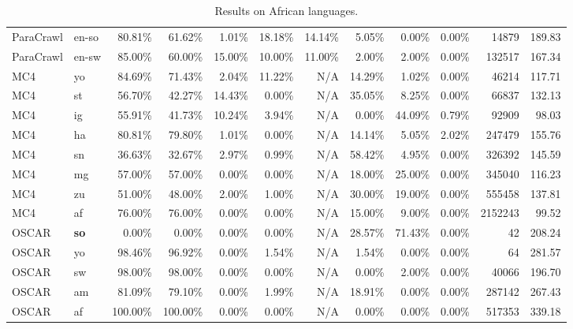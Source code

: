 \begin{table*}[hbt!]
{\begin{tabular}{l|l|rrrr|rrrr|rr}
            ParaCrawl  & en-so                   & 80.81\%  & 61.62\%  & 1.01\%  & 18.18\% & 14.14\% & 5.05\%  & 0.00\%  & 0.00\%  & 14879       & 189.83            \\
            ParaCrawl  & en-sw                   & 85.00\%  & 60.00\%  & 15.00\% & 10.00\% & 11.00\% & 2.00\%  & 2.00\%  & 0.00\%  & 132517      & 167.34            \\
            MC4        & yo                      & 84.69\%  & 71.43\%  & 2.04\%  & 11.22\% & N/A     & 14.29\% & 1.02\%  & 0.00\%  & 46214       & 117.71            \\
            MC4        & st                      & 56.70\%  & 42.27\%  & 14.43\% & 0.00\%  & N/A     & 35.05\% & 8.25\%  & 0.00\%  & 66837       & 132.13            \\
            MC4        & ig                      & 55.91\%  & 41.73\%  & 10.24\% & 3.94\%  & N/A     & 0.00\%  & 44.09\% & 0.79\%  & 92909       & 98.03             \\
            MC4        & ha                      & 80.81\%  & 79.80\%  & 1.01\%  & 0.00\%  & N/A     & 14.14\% & 5.05\%  & 2.02\%  & 247479      & 155.76            \\
            MC4        & sn                      & 36.63\%  & 32.67\%  & 2.97\%  & 0.99\%  & N/A     & 58.42\% & 4.95\%  & 0.00\%  & 326392      & 145.59            \\
            MC4        & mg                      & 57.00\%  & 57.00\%  & 0.00\%  & 0.00\%  & N/A     & 18.00\% & 25.00\% & 0.00\%  & 345040      & 116.23            \\
            MC4        & zu                      & 51.00\%  & 48.00\%  & 2.00\%  & 1.00\%  & N/A     & 30.00\% & 19.00\% & 0.00\%  & 555458      & 137.81            \\
            MC4        & af                      & 76.00\%  & 76.00\%  & 0.00\%  & 0.00\%  & N/A     & 15.00\% & 9.00\%  & 0.00\%  & 2152243     & 99.52             \\
            OSCAR      & \textbf{so}             & 0.00\%   & 0.00\%   & 0.00\%  & 0.00\%  & N/A     & 28.57\% & 71.43\% & 0.00\%  & 42          & 208.24            \\
            OSCAR      & yo                      & 98.46\%  & 96.92\%  & 0.00\%  & 1.54\%  & N/A     & 1.54\%  & 0.00\%  & 0.00\%  & 64          & 281.57            \\
            OSCAR      & sw                      & 98.00\%  & 98.00\%  & 0.00\%  & 0.00\%  & N/A     & 0.00\%  & 2.00\%  & 0.00\%  & 40066       & 196.70            \\
            OSCAR      & am                      & 81.09\%  & 79.10\%  & 0.00\%  & 1.99\%  & N/A     & 18.91\% & 0.00\%  & 0.00\%  & 287142      & 267.43            \\
            OSCAR      & af                      & 100.00\% & 100.00\% & 0.00\%  & 0.00\%  & N/A     & 0.00\%  & 0.00\%  & 0.00\%  & 517353      & 339.18            \\
            \bottomrule
        \end{tabular}%
    }
    \caption{Results on African languages.}

    \label{tab:africa-full}
\end{table*}